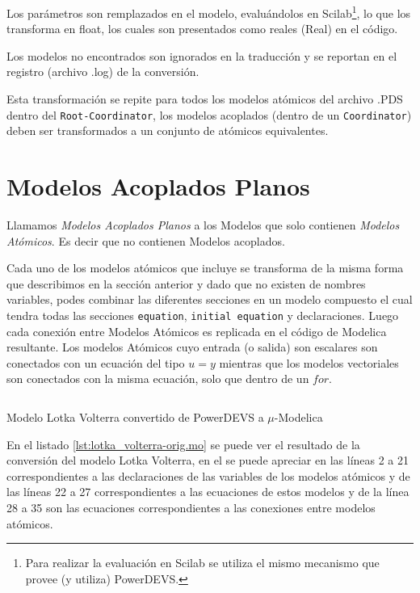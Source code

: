 	Los parámetros son remplazados en el modelo, evaluándolos en Scilab\footnote{Para realizar la evaluación en Scilab se utiliza el mismo mecanismo que 
	provee (y utiliza) PowerDEVS.}, lo que los transforma en float, los cuales son presentados como reales (Real) en el código.

	Los modelos no encontrados son ignorados en la traducción y se reportan en el registro (archivo .log) de la conversión.

	Esta transformación se repite para todos los modelos atómicos del archivo .PDS dentro del \texttt{Root-Coordinator}, los modelos acoplados 
	(dentro de un \texttt{Coordinator}) deben ser transformados a un conjunto de atómicos equivalentes.

\section{Modelos Acoplados Planos}

	Llamamos \emph{Modelos Acoplados Planos} a los Modelos que solo contienen \emph{Modelos Atómicos}. Es decir que no contienen Modelos acoplados.

	Cada uno de los modelos atómicos que incluye se transforma de la misma forma que describimos en la sección anterior y dado que no existen  
	de nombres variables, podes combinar las diferentes secciones en un modelo compuesto el cual tendra todas las secciones \texttt{equation}, \texttt{initial equation} y declaraciones.
	Luego cada conexión entre Modelos Atómicos es replicada en el código de Modelica resultante. Los modelos Atómicos cuyo entrada (o salida) son escalares son conectados con un ecuación 
	del tipo $u = y$ mientras que los modelos vectoriales son conectados con la misma ecuación, solo que dentro de un $for$.

\begin{listing}[H]
	\inputminted[linenos]{modelica}{src/lotka_volterra-orig.mo}
	\caption{Modelo Lotka Volterra convertido de PowerDEVS a $\mu$-Modelica}
	\label{lst:lotka_volterra-orig.mo}
\end{listing}

	En el listado \ref{lst:lotka_volterra-orig.mo} se puede ver el resultado de la conversión del modelo Lotka Volterra, en el se puede apreciar en las líneas 
	2 a 21 correspondientes a las declaraciones de las variables de los modelos atómicos y de las líneas 22 a 27 correspondientes a las ecuaciones de estos 
	modelos y de la línea 28 a 35 son las ecuaciones correspondientes a las conexiones entre modelos atómicos.

